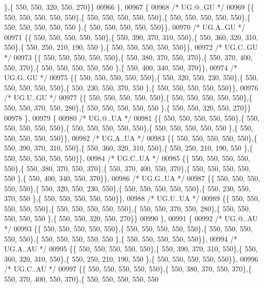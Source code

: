 \begin{DoxyCode}
      \},\{ 550, 550, 320, 550, 270\}\}
00966 \},
00967 \{
00968 \textcolor{comment}{/* UG.@..GU */}
00969 \{\{ 550, 550, 550, 550, 550\},\{ 550, 550, 550, 550, 550\},\{ 550, 550, 550, 550, 550\},\{ 550, 550, 550, 550, 550
      \},\{ 550, 550, 550, 550, 550\}\},
00970 \textcolor{comment}{/* UG.A..GU */}
00971 \{\{ 550, 550, 550, 550, 550\},\{ 550, 390, 370, 310, 550\},\{ 550, 360, 320, 310, 550\},\{ 550, 250, 210, 190, 550
      \},\{ 550, 550, 550, 550, 550\}\},
00972 \textcolor{comment}{/* UG.C..GU */}
00973 \{\{ 550, 550, 550, 550, 550\},\{ 550, 380, 370, 550, 370\},\{ 550, 370, 400, 550, 370\},\{ 550, 550, 550, 550, 550
      \},\{ 550, 400, 340, 550, 370\}\},
00974 \textcolor{comment}{/* UG.G..GU */}
00975 \{\{ 550, 550, 550, 550, 550\},\{ 550, 320, 550, 230, 550\},\{ 550, 550, 550, 550, 550\},\{ 550, 230, 550, 370, 550
      \},\{ 550, 550, 550, 550, 550\}\},
00976 \textcolor{comment}{/* UG.U..GU */}
00977 \{\{ 550, 550, 550, 550, 550\},\{ 550, 550, 550, 550, 550\},\{ 550, 550, 370, 550, 280\},\{ 550, 550, 550, 550, 550
      \},\{ 550, 550, 320, 550, 270\}\}
00978 \},
00979 \{
00980 \textcolor{comment}{/* UG.@..UA */}
00981 \{\{ 550, 550, 550, 550, 550\},\{ 550, 550, 550, 550, 550\},\{ 550, 550, 550, 550, 550\},\{ 550, 550, 550, 550, 550
      \},\{ 550, 550, 550, 550, 550\}\},
00982 \textcolor{comment}{/* UG.A..UA */}
00983 \{\{ 550, 550, 550, 550, 550\},\{ 550, 390, 370, 310, 550\},\{ 550, 360, 320, 310, 550\},\{ 550, 250, 210, 190, 550
      \},\{ 550, 550, 550, 550, 550\}\},
00984 \textcolor{comment}{/* UG.C..UA */}
00985 \{\{ 550, 550, 550, 550, 550\},\{ 550, 380, 370, 550, 370\},\{ 550, 370, 400, 550, 370\},\{ 550, 550, 550, 550, 550
      \},\{ 550, 400, 340, 550, 370\}\},
00986 \textcolor{comment}{/* UG.G..UA */}
00987 \{\{ 550, 550, 550, 550, 550\},\{ 550, 320, 550, 230, 550\},\{ 550, 550, 550, 550, 550\},\{ 550, 230, 550, 370, 550
      \},\{ 550, 550, 550, 550, 550\}\},
00988 \textcolor{comment}{/* UG.U..UA */}
00989 \{\{ 550, 550, 550, 550, 550\},\{ 550, 550, 550, 550, 550\},\{ 550, 550, 370, 550, 280\},\{ 550, 550, 550, 550, 550
      \},\{ 550, 550, 320, 550, 270\}\}
00990 \},
00991 \{
00992 \textcolor{comment}{/* UG.@..AU */}
00993 \{\{ 550, 550, 550, 550, 550\},\{ 550, 550, 550, 550, 550\},\{ 550, 550, 550, 550, 550\},\{ 550, 550, 550, 550, 550
      \},\{ 550, 550, 550, 550, 550\}\},
00994 \textcolor{comment}{/* UG.A..AU */}
00995 \{\{ 550, 550, 550, 550, 550\},\{ 550, 390, 370, 310, 550\},\{ 550, 360, 320, 310, 550\},\{ 550, 250, 210, 190, 550
      \},\{ 550, 550, 550, 550, 550\}\},
00996 \textcolor{comment}{/* UG.C..AU */}
00997 \{\{ 550, 550, 550, 550, 550\},\{ 550, 380, 370, 550, 370\},\{ 550, 370, 400, 550, 370\},\{ 550, 550, 550, 550, 550

\end{DoxyCode}
